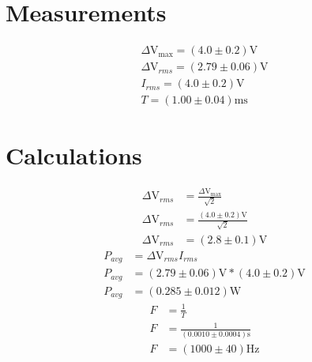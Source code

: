 \documentclass{report}
\begin{document}
\section{Measurements}

\begin{gather}
    \Delta\si{\volt}_{\max}=(4.0\pm0.2)\si{\volt}\\
    \Delta\si{\volt}_{rms}=(2.79\pm0.06)\si{\volt} \label{eq:vrmsmeasured}\\
    I_{rms}=(4.0\pm0.2)\si{\volt}\\ 
    T=(1.00\pm0.04)\si{\milli\second}
\end{gather}

\section{Calculations}
\begin{align}
    \Delta\si{\volt}_{rms}&=\frac{\Delta\si{\volt}_{\max}}{\sqrt{2}} \nonumber\\
    \Delta\si{\volt}_{rms}&=\frac{(4.0\pm0.2)\si{\volt}}{\sqrt{2}}\nonumber\\
    \Delta\si{\volt}_{rms}&=(2.8\pm0.1)\si{\volt} \label{eq:vrmscalc}
\end{align}
\begin{align}
    P_{avg}&=\Delta\si{\volt}_{rms}I_{rms}\nonumber\\
    P_{avg}&=(2.79\pm0.06)\si{\volt} * (4.0\pm0.2)\si{\volt} \nonumber\\ 
    P_{avg}&=(0.285\pm0.012)\si{\watt}
\end{align}
\begin{align}
    F&=\frac{1}{T} \nonumber\\
    F &=\frac{1}{(0.0010\pm 0.0004) \si{\second} }\nonumber\\ 
    F &=(1000\pm 40)\si{\hertz} \label{eq:frequencycalc}
\end{align}
\end{document}
